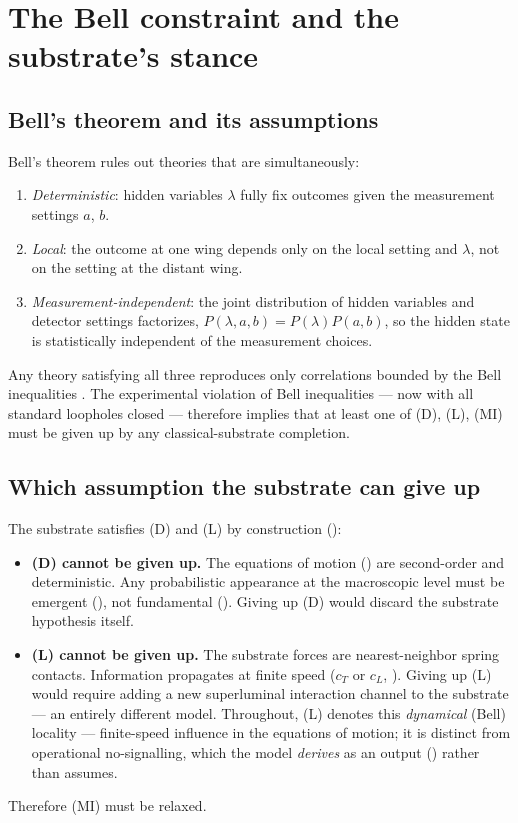\section{The Bell constraint and the substrate's stance}
\label{sec:bell-constraint}

\subsection{Bell's theorem and its assumptions}

Bell's theorem rules out theories that are simultaneously:
\begin{enumerate}
  \item[(D)] \emph{Deterministic}: hidden variables $\lambda$ fully fix outcomes given the
  measurement settings $a$, $b$.
  \item[(L)] \emph{Local}: the outcome at one wing depends only on the local setting and $\lambda$,
  not on the setting at the distant wing.
  \item[(MI)] \emph{Measurement-independent}: the joint distribution of hidden variables and
  detector settings factorizes, $P(\lambda,a,b)=P(\lambda)P(a,b)$, so the hidden state is
  statistically independent of the measurement choices.
\end{enumerate}
Any theory satisfying all three reproduces only correlations bounded by the Bell inequalities
\citep{Bell1964,CHSH1969}.
The experimental violation of Bell inequalities --- now with all standard loopholes closed
\citep{Hensen2015,Giustina2015,Shalm2015} --- therefore implies that at least one of (D), (L),
(MI) must be given up by any classical-substrate completion.

\subsection{Which assumption the substrate can give up}
\label{subsec:which-assumption}

The substrate satisfies (D) and (L) by construction ():
\begin{itemize}
  \item \textbf{(D) cannot be given up.} The equations of motion () are
  second-order and deterministic.
  Any probabilistic appearance at the macroscopic level must be emergent
  (), not fundamental ().
  Giving up (D) would discard the substrate hypothesis itself.

  \item \textbf{(L) cannot be given up.} The substrate forces are nearest-neighbor spring contacts.
  Information propagates at finite speed ($c_T$ or $c_L$, ).
  Giving up (L) would require adding a new superluminal interaction channel to the substrate ---
  an entirely different model.
  Throughout, (L) denotes this \emph{dynamical} (Bell) locality --- finite-speed influence in the
  equations of motion; it is distinct from operational no-signalling, which the model
  \emph{derives} as an output () rather than assumes.
\end{itemize}
Therefore (MI) must be relaxed.

